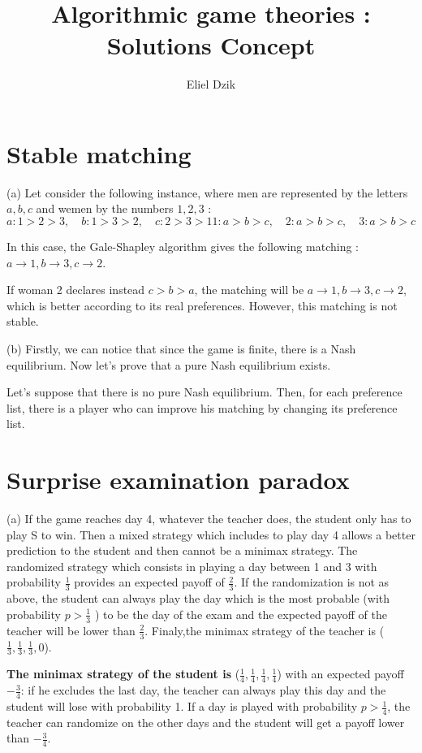\documentclass[11pt, a4paper]{article}
\title{Algorithmic game theories : Solutions Concept}
\author{Eliel Dzik}
\begin{document}
\date{}
\maketitle

\section{Stable matching}
(a) Let consider the following instance, where men are represented by the letters $a, b, c$ and wemen by the numbers $1, 2, 3$ :
$$
a : 1 > 2 > 3, \quad b : 1 > 3 > 2, \quad c : 2 > 3 > 1
1 : a > b > c, \quad 2 : a > b > c, \quad 3 : a > b > c
$$

In this case, the Gale-Shapley algorithm gives the following matching : $a \rightarrow 1, b \rightarrow 3, c \rightarrow 2$. 

If woman 2 declares instead $c > b > a$, the matching will be $a \rightarrow 1, b \rightarrow 3, c \rightarrow 2$, which is better according to its real preferences.
However, this matching is not stable.

(b) Firstly, we can notice that since the game is finite, there is a Nash equilibrium. Now let's prove that a pure Nash equilibrium exists.

Let's suppose that there is no pure Nash equilibrium. Then, for each preference list, there is a player who can improve his matching by changing its preference list.


\section{Surprise examination paradox}
(a) If the game reaches day 4,  whatever the teacher does, the student only has to play S to win. 
Then a mixed strategy which includes to play day 4 allows a better prediction to the student and then cannot be a minimax strategy.
The randomized strategy which consists in playing a day between 1 and 3 with probability $\frac{1}{3}$ provides an expected payoff of $\frac{2}{3}$.
If the randomization is not as above, the student can always play the day which is the most probable (with probability $ p > \frac{1}{3}$ )
 to be the day of the exam and the expected payoff of the teacher will be lower than $\frac{2}{3}$. Finaly,the minimax strategy of the
 teacher is ($\frac{1}{3}, \frac{1}{3}, \frac{1}{3}, 0 $).

 \textbf{The minimax strategy of the student is} ($\frac{1}{4}, \frac{1}{4}, \frac{1}{4}, \frac{1}{4} $) with an expected payoff $-\frac{3}{4}$: if he excludes
the last day, the teacher can always play this day and the student will lose with probability 1.
If a day is played with probability $ p > \frac{1}{4}$, the teacher can randomize on the other days and the student will get a payoff lower than $-\frac{3}{4}$.
\end{document}
